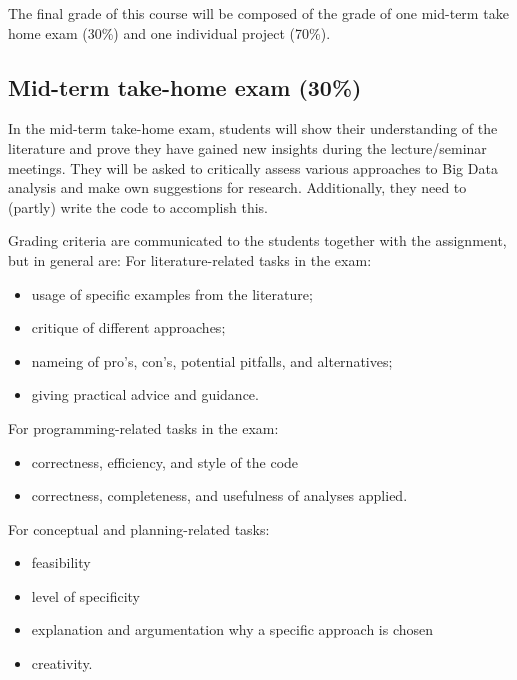 The final grade of this course will be composed of the grade of one mid-term take home exam (30\%) and one individual project (70\%).

\subsection*{Mid-term take-home exam (30\%)}
In the mid-term take-home exam, students will show their understanding of the literature and prove they have gained new insights during the lecture/seminar meetings. They will be asked to critically assess various approaches to Big Data analysis and make own suggestions for research. Additionally, they need to (partly) write the code to accomplish this.

Grading criteria are communicated to the students together with the assignment, but in general are:
For literature-related tasks in the exam:

\begin{itemize}
	\item usage of specific examples from the literature;
	\item critique of different approaches;
	\item nameing of pro's, con's, potential pitfalls, and alternatives;
	\item giving practical advice and guidance.
\end{itemize}
For programming-related tasks in the exam:
\begin{itemize}
	\item correctness, efficiency, and style of the code
	\item correctness, completeness, and usefulness of analyses applied.
\end{itemize}
For conceptual and planning-related tasks:
\begin{itemize}
	\item feasibility
	\item level of specificity
	\item explanation and argumentation why a specific approach is chosen
	\item creativity.
\end{itemize}

